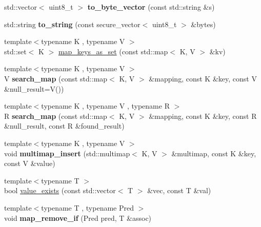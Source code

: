 \begin{DoxyCompactItemize}
\item 
\mbox{\label{namespace_botan_ae3554f55aa9609c63cd1ee4a2cb6f64a}} 
std\+::vector$<$ uint8\+\_\+t $>$ {\bfseries to\+\_\+byte\+\_\+vector} (const std\+::string \&s)
\item 
\mbox{\label{namespace_botan_ac536c375ee44ac6b91f70599afe52890}} 
std\+::string {\bfseries to\+\_\+string} (const secure\+\_\+vector$<$ uint8\+\_\+t $>$ \&bytes)
\item 
{\footnotesize template$<$typename K , typename V $>$ }\\std\+::set$<$ K $>$ \mbox{\hyperlink{namespace_botan_a967fe441532a76e590a656bb8b9f177a}{map\+\_\+keys\+\_\+as\+\_\+set}} (const std\+::map$<$ K, V $>$ \&kv)
\item 
\mbox{\label{namespace_botan_a858054ae4327d92f5e308fd10e9d751b}} 
{\footnotesize template$<$typename K , typename V $>$ }\\V {\bfseries search\+\_\+map} (const std\+::map$<$ K, V $>$ \&mapping, const K \&key, const V \&null\+\_\+result=V())
\item 
\mbox{\label{namespace_botan_a659beb72cc59a86c87a51b0497e840fb}} 
{\footnotesize template$<$typename K , typename V , typename R $>$ }\\R {\bfseries search\+\_\+map} (const std\+::map$<$ K, V $>$ \&mapping, const K \&key, const R \&null\+\_\+result, const R \&found\+\_\+result)
\item 
\mbox{\label{namespace_botan_aab0b92bc1b95cf67b1367760c054c45d}} 
{\footnotesize template$<$typename K , typename V $>$ }\\void {\bfseries multimap\+\_\+insert} (std\+::multimap$<$ K, V $>$ \&multimap, const K \&key, const V \&value)
\item 
{\footnotesize template$<$typename T $>$ }\\bool \mbox{\hyperlink{namespace_botan_ae62a85e0371b9210c98d9dcdb1632502}{value\+\_\+exists}} (const std\+::vector$<$ T $>$ \&vec, const T \&val)
\item 
\mbox{\label{namespace_botan_a0e90f6d45c94fd60b3b4ad3fcf457508}} 
{\footnotesize template$<$typename T , typename Pred $>$ }\\void {\bfseries map\+\_\+remove\+\_\+if} (Pred pred, T \&assoc)

\end{DoxyCompactItemize}
